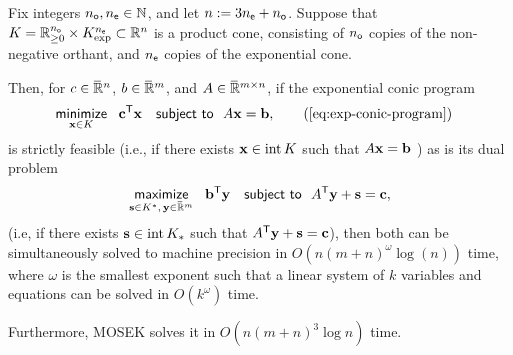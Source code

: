 \documentclass[twoside]{article}
\begin{document}
\begin{lemma} \label{lem:mainlemma}
    Fix integers $n_{\sf o}, n_{\sf e} \in \mathbb N$, and let $n:= 3n_{\sf e} + n_{\sf o}$.
    Suppose that $K = \mathbb R_{\ge 0}^{n_{\sf o}} \times K^{n_{\sf e}}_{\exp} \subset \mathbb R^n$ is a product cone, consisting of $n_{\sf o}$ copies of the non-negative orthant, and $n_{\sf e}$ copies of the exponential cone. 
    
    Then, for
    $c \in \mskip1mu\overline{\mskip-1mu\mathbb R\!}\,^{n}$, $ b \in \mskip1mu\overline{\mskip-1mu\mathbb R\!}\,^m$, and $A \in \mskip1mu\overline{\mskip-1mu\mathbb R\!}\,^{m \times n}$,
    if the exponential conic program
    \begin{align*}
        &
        \mathop{\text{\sf minimize}}\limits_{
            \mat x \in K}~~ \mat c^{\sf T} \mat x
        \quad\text{\sf subject to}~~ A \mat x = \mat b,
        \tag{\ref{eq:exp-conic-program}}
    \end{align*}
    is strictly feasible (i.e., if there exists $\mathbf{x} \in \mathrm{int}\, K$  such that $A \mathbf{x} = \mathbf{b}$ )
    as is its dual problem
    \[
        \mathop{\text{\sf maximize}} 
            \limits_{
            \mathbf{s} \in K^*,\, \mathbf{y} \in \mskip1mu\overline{\mskip-1mu\mathbb R\!}\,^m} ~~ \mathbf{b}^{\sf T} \mathbf{y}
        \quad\text{\sf subject to}~~  A^{\sf T} \mathbf{y}  +  \mathbf{s} = \mathbf{c},
    \]
    (i.e, if there exists $\mathbf{s} \in \mathrm{int}\,K_*$ such that $A^{\sf T} \mathbf{y} + \mathbf{s} = \mathbf{c}$), 
    then both
    can be simultaneously
    solved to machine precision
    in $O(n (m+n)^{\omega} \log(n)
    )$ time,
    where $\omega$ is the smallest exponent such that a linear system of $k$ variables and equations can be solved in $O(k^\omega)$ time. 
    
    Furthermore, MOSEK solves it in $O(n (m+n)^3 \log n)$ time. 
\end{lemma}
\end{document}
